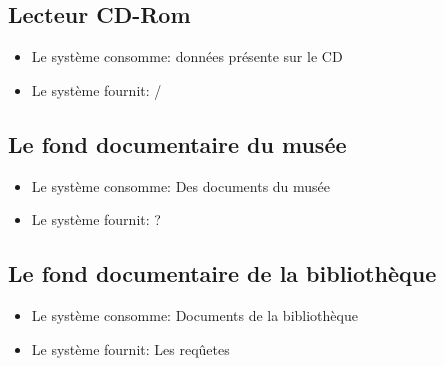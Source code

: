 \documentclass{article}
\begin{document}
		\subsection{Lecteur CD-Rom}
		\begin{itemize}
			\item Le système consomme: données présente sur le CD
			\item Le système fournit: / 
		\end{itemize}
		\subsection{Le fond documentaire du musée}
		\begin{itemize}
			\item Le système consomme: Des documents du musée
			\item Le système fournit: ? 
		\end{itemize}
		\subsection{Le fond documentaire de la bibliothèque}
		\begin{itemize}
			\item Le système consomme: Documents de la bibliothèque
			\item Le système fournit: Les reqûetes 
		\end{itemize}
		\section{}
		
\end{document}
